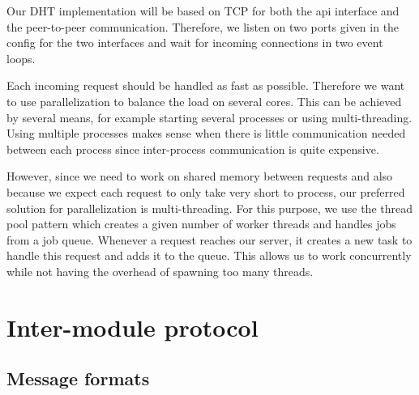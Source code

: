 \documentclass[a4paper, 11pt]{article}
\begin{document}
Our DHT implementation will be based on TCP for both the api interface and the peer-to-peer communication. Therefore, we listen on two ports given in the config for the two interfaces and wait for incoming connections in two event loops.

Each incoming request should be handled as fast as possible. Therefore we want to use parallelization to balance the load on several cores. This can be achieved by several means, for example starting several processes or using multi-threading.
Using multiple processes makes sense when there is little communication needed between each process since inter-process communication is quite expensive.

However, since we need to work on shared memory between requests and also because we expect each request to only take very short to process, our preferred solution for parallelization is multi-threading. For this purpose, we use the thread pool pattern which creates a given number of worker threads and handles jobs from a job queue. Whenever a request reaches our server, it creates a new task to handle this request and adds it to the queue. This allows us to work concurrently while not having the overhead of spawning too many threads.




\section*{Inter-module protocol}


\subsection*{Message formats}
\end{document}
